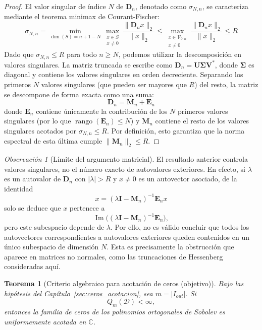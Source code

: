 \documentclass[12pt,a4paper]{article}
\newtheorem{theorem}{Teorema}
\theoremstyle{definition}
\theoremstyle{remark}
\newtheorem{remark}{Observación}
\begin{document}
\begin{proof}
	El valor singular de índice $N$ de $\mathbf{D}_n$, denotado como $\sigma_{N,n}$, se caracteriza mediante el teorema minimax de Courant-Fischer:
	\begin{equation}
		\sigma_{N,n} = \min_{\dim(S) = n+1-N} \max_{\substack{x \in S \\ x \neq 0}} \frac{\|\mathbf{D}_n x\|_2}{\|x\|_2} \le \max_{\substack{x \in \mathcal{V}_{0,n} \\ x \neq 0}} \frac{\|\mathbf{D}_n x\|_2}{\|x\|_2} \le R
	\end{equation}
	Dado que $\sigma_{N,n} \le R$ para todo $n \ge N$, podemos utilizar la descomposición en valores singulares. La matriz truncada se escribe como $\mathbf{D}_n = \mathbf{U} \mathbf{\Sigma} \mathbf{V}^*$, donde $\mathbf{\Sigma}$ es diagonal y contiene los valores singulares en orden decreciente.
	Separando los primeros $N$ valores singulares (que pueden ser mayores que $R$) del resto, la matriz se descompone de forma exacta como una suma:
	$$ \mathbf{D}_n = \mathbf{M}_n + \mathbf{E}_n $$
	donde $\mathbf{E}_n$ contiene únicamente la contribución de los $N$ primeros valores singulares (por lo que $\operatorname{rango}(\mathbf{E}_n) \le N$) y $\mathbf{M}_n$ contiene el resto de los valores singulares acotados por $\sigma_{N,n} \le R$. Por definición, esto garantiza que la norma espectral de esta última cumple $\|\mathbf{M}_n\|_2 \le R$.
\end{proof}

\begin{remark}[Límite del argumento matricial]
	El resultado anterior controla valores singulares, no el número exacto de autovalores exteriores. En efecto, si $\lambda$ es un autovalor de $\mathbf{D}_n$ con $|\lambda| > R$ y $x \neq 0$ es un autovector asociado, de la identidad
	\begin{equation}\label{eq:autovector_escape}
		x = (\lambda \mathbf{I} - \mathbf{M}_n)^{-1} \mathbf{E}_n x
	\end{equation}
	solo se deduce que $x$ pertenece a
	\[
		\operatorname{Im}\bigl((\lambda \mathbf{I} - \mathbf{M}_n)^{-1} \mathbf{E}_n\bigr),
	\]
	pero este subespacio depende de $\lambda$. Por ello, no es válido concluir que todos los autovectores correspondientes a autovalores exteriores queden contenidos en un único subespacio de dimensión $N$. Esta es precisamente la obstrucción que aparece en matrices no normales, como las truncaciones de Hessenberg consideradas aquí.
\end{remark}

\begin{theorem}[Criterio algebraico para acotación de ceros (objetivo)]\label{thm:criterio_singular_ceros_objetivo}
	Bajo las hipótesis del Capítulo~\ref{sec:ceros_acotacion}, sea $m=|I_{out}|$. Si
	\[
		Q_m(\mathcal D)<\infty,
	\]
	entonces la familia de ceros de los polinomios ortogonales de Sobolev es uniformemente acotada en $\mathbb C$.
\end{theorem}
\end{document}
